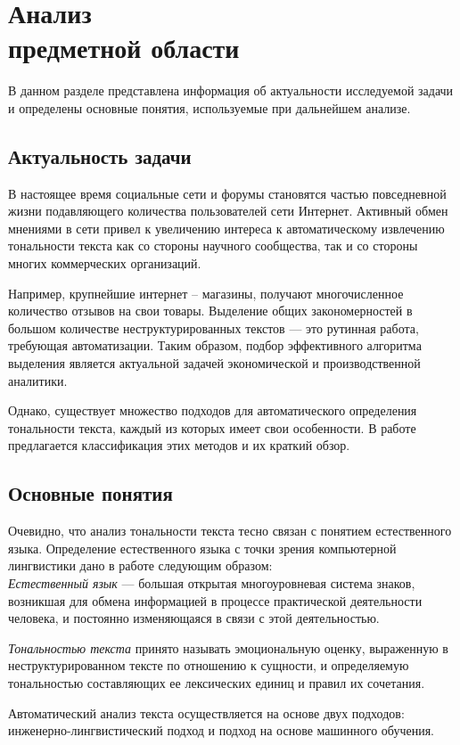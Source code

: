 \chapter{Анализ \\ предметной области}
В данном разделе представлена информация об актуальности исследуемой задачи и определены основные понятия, используемые при дальнейшем анализе.
\section{Актуальность задачи}
В настоящее время социальные сети и форумы становятся частью повседневной жизни подавляющего количества пользователей сети Интернет. Активный обмен мнениями в сети привел к увеличению интереса к автоматическому извлечению тональности текста как со стороны научного сообщества, так и со стороны многих коммерческих организаций.

Например, крупнейшие интернет -- магазины, получают многочисленное количество отзывов на свои товары. Выделение общих закономерностей в большом количестве неструктурированных текстов --- это рутинная работа, требующая автоматизации. Таким образом, подбор эффективного алгоритма выделения является актуальной задачей экономической и производственной аналитики. 

Однако, существует множество подходов для автоматического определения тональности текста, каждый из которых имеет свои особенности. В работе предлагается классификация этих методов и их краткий обзор.
\section{Основные понятия}
Очевидно, что анализ тональности текста тесно связан с понятием естественного языка. Определение естественного языка с точки зрения компьютерной лингвистики дано в работе \cite{ling-gen} следующим образом: \\
\textit{Естественный язык} --- большая открытая многоуровневая система знаков, возникшая для обмена информацией в процессе практической деятельности человека, и постоянно изменяющаяся в связи с этой деятельностью.

\textit{Тональностью текста} принято называть эмоциональную оценку, выраженную в неструктурированном тексте по отношению к сущности, и определяемую тональностью составляющих ее лексических единиц и правил их сочетания.

Автоматический анализ текста осуществляется на основе двух подходов: инженерно-лингвистический подход и подход на основе машинного обучения.

